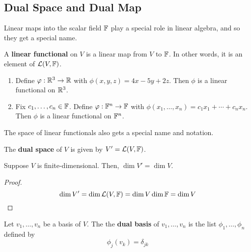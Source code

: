 \subsection*{Dual Space and Dual Map}
Linear maps into the scalar field $\mathbb F$ play a special role in linear algebra, and so they get a special name.
\begin{definition}
    A \textbf{linear functional} on $V$ is a linear map from $V$ to $\mathbb F$. In other words, it is an element of $\mathcal{L}(V,\mathbb F)$.
\end{definition}
\begin{example}
    \begin{enumerate}
        \item Define $\varphi : \mathbb{R}^3\to \mathbb{R}$ with $\phi(x,y,z) = 4x-5y+2z$. Then $\phi$ is a linear functional on $\mathbb{R}^3$.
        \item Fix $c_1, \dots, c_n\in\mathbb F$. Define $\varphi: \mathbb F^n \to \mathbb F$ with $\phi(x_1, \dots, x_n) = c_1x_1 + \cdots + c_nx_n$. Then $\phi$ is a linear functional on $\mathbb F^n$.
    \end{enumerate}
\end{example}
The space of linear functionals also gets a special name and notation.
\begin{definition}
    The \textbf{dual space} of $V$ is given by $V' = \mathcal{L}(V,\mathbb F)$.
\end{definition}
\begin{theorem}
    Suppose $V$ is finite-dimensional. Then, $\dim V' = \dim V$.
\end{theorem}
\begin{proof}
    \[ \dim V' = \dim \mathcal{L}(V, \mathbb F) = \dim V \dim \mathbb F = \dim V\]
\end{proof}
\begin{definition}
    Let $v_1, \dots, v_n$ be a basis of $V$. The the \textbf{dual basis} of $v_1, \dots, v_n$ is the list $\phi_1, \dots, \phi_n$ defined by
    \[ \phi_j(v_k) = \delta_{jk} \]
\end{definition}

